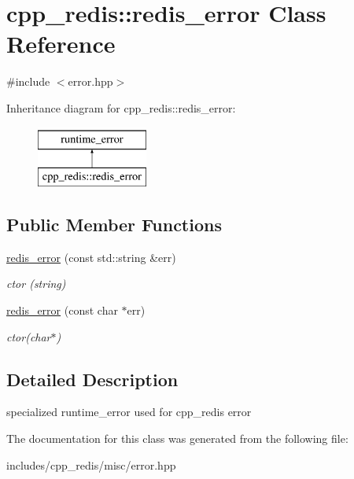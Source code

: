\hypertarget{classcpp__redis_1_1redis__error}{}\section{cpp\+\_\+redis\+:\+:redis\+\_\+error Class Reference}
\label{classcpp__redis_1_1redis__error}


{\ttfamily \#include $<$error.\+hpp$>$}

Inheritance diagram for cpp\+\_\+redis\+:\+:redis\+\_\+error\+:\begin{figure}[H]
\begin{center}
\leavevmode
\includegraphics[height=2.000000cm]{classcpp__redis_1_1redis__error}
\end{center}
\end{figure}
\subsection*{Public Member Functions}
\begin{DoxyCompactItemize}
\item 
\mbox{\label{classcpp__redis_1_1redis__error_a1445e654b3936c7f5aa1c298bcf24966}} 
\hyperlink{classcpp__redis_1_1redis__error_a1445e654b3936c7f5aa1c298bcf24966}{redis\+\_\+error} (const std\+::string \&err)
\begin{DoxyCompactList}\small\item\em ctor (string) \end{DoxyCompactList}\item 
\mbox{\label{classcpp__redis_1_1redis__error_a0ced25483119c2318b1a5a69cac1919f}} 
\hyperlink{classcpp__redis_1_1redis__error_a0ced25483119c2318b1a5a69cac1919f}{redis\+\_\+error} (const char $\ast$err)
\begin{DoxyCompactList}\small\item\em ctor(char$\ast$) \end{DoxyCompactList}\end{DoxyCompactItemize}


\subsection{Detailed Description}
specialized runtime\+\_\+error used for cpp\+\_\+redis error 

The documentation for this class was generated from the following file\+:\begin{DoxyCompactItemize}
\item 
includes/cpp\+\_\+redis/misc/error.\+hpp\end{DoxyCompactItemize}
